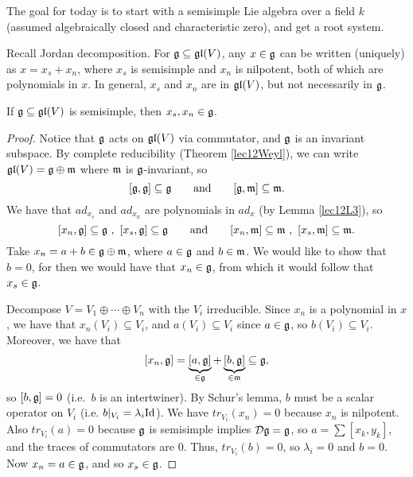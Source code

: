  \setcounter{lecture}{13}

 The goal for today is to start with a semisimple Lie algebra over a field $k$
 (assumed algebraically closed and characteristic zero), and get a root system.

 Recall Jordan decomposition. For $\mathfrak{g}\subseteq \mathfrak{gl}(V)$,
 any $x\in \mathfrak{g}$ can be written (uniquely) as $x=x_s+x_n$, where $x_s$ is semisimple and
 $x_n$ is nilpotent, both of which are polynomials in $x$. In general, $x_s$ and $x_n$
 are in $\mathfrak{gl}(V)$, but not necessarily in $\mathfrak{g}$.
 \begin{proposition}
   If $\mathfrak{g}\subseteq \mathfrak{gl}(V)$ is semisimple, then $x_s, x_n \in \mathfrak{g}$.
 \end{proposition}
 \begin{proof}
   Notice that $\mathfrak{g}$ acts on $\mathfrak{gl}(V)$ via commutator, and $\mathfrak{g}$ is an invariant
   subspace. By complete reducibility (Theorem \ref{lec12Weyl}), we can write $\mathfrak{gl}(V)
   = \mathfrak{g}\oplus \mathfrak{m}$ where $\mathfrak{m}$ is $\mathfrak{g}$-invariant, so
   \[
     [\mathfrak{g},\mathfrak{g}]\subseteq \mathfrak{g} \qquad \text{and} \qquad [\mathfrak{g},\mathfrak{m}]\subseteq \mathfrak{m}.
   \]
   We have that $ad_{x_s}$ and $ad_{x_n}$ are polynomials in $ad_x$ (by Lemma
   \ref{lec12L3}), so
   \[
    [x_n,\mathfrak{g}]\subseteq \mathfrak{g}\ ,\ [x_s,\mathfrak{g}]\subseteq \mathfrak{g} \qquad \text{and} \qquad
    [x_n,\mathfrak{m}]\subseteq \mathfrak{m}\ ,\ [x_s,\mathfrak{m}]\subseteq \mathfrak{m}.
   \]
   Take $x_n = a+b\in \mathfrak{g}\oplus \mathfrak{m}$, where $a\in \mathfrak{g}$ and $b\in \mathfrak{m}$. We would like to
   show that $b=0$, for then we would have that $x_n\in \mathfrak{g}$, from which it would
   follow that $x_s\in \mathfrak{g}$.


   Decompose $V= V_1\oplus \cdots \oplus V_n$ with the $V_i$ irreducible. Since $x_n$
   is a polynomial in $x$, we have that $x_n(V_i)\subseteq V_i$, and $a(V_i)\subseteq
   V_i$ since $a\in \mathfrak{g}$, so $b(V_i)\subseteq V_i$. Moreover, we have that
   \[
     [x_n,\mathfrak{g}]=\underbrace{[a,\mathfrak{g}]}_{\in \mathfrak{g}}+\underbrace{[b,\mathfrak{g}]}_{\in \mathfrak{m}}\subseteq \mathfrak{g},
   \]
   so $[b,\mathfrak{g}]=0$ (i.e.\ $b$ is an intertwiner). By Schur's lemma, $b$ must be a scalar
   operator on $V_i$ (i.e. $b|_{V_i}=\lambda_i\mathrm{Id}$). We have $tr_{V_i}(x_n)=0$ because
   $x_n$ is nilpotent. Also $tr_{V_i}(a)= 0$ because $\mathfrak{g}$ is semisimple implies
   $\mathcal{D}\mathfrak{g}=\mathfrak{g}$, so $a=\sum [x_k,y_k]$, and the traces of commutators are $0$. Thus,
   $tr_{V_i}(b)=0$, so $\lambda_i=0$ and $b=0$. Now $x_n=a\in \mathfrak{g}$, and so $x_s\in \mathfrak{g}$.
 \end{proof}
